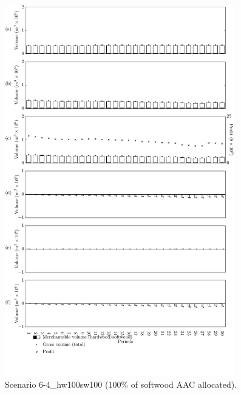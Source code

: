 \begin{figure}[h]
  \centering
  \includegraphics[width=10cm]{images/appendix/s6-1_p30a01}
  \caption{Scenario 6-4\_hw100sw100 (100\% of softwood AAC allocated).}
  \label{fig:s6-4_hw100sw100}
\end{figure}

